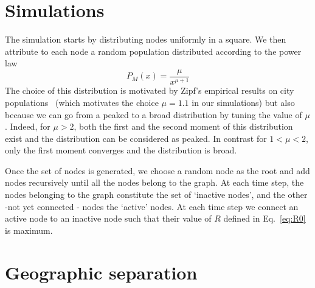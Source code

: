 \begin{materials}

\section{Simulations} 

The simulation starts by distributing nodes uniformly in a square. We then attribute to each node a random population distributed according to the power law
\begin{equation}
P_M(x) = \frac{\mu}{x^{\mu+1}}
\end{equation}
The choice of this distribution is motivated by Zipf's empirical results on city populations~\cite{Zipf:1949} (which motivates the choice $\mu=1.1$ in our simulations) but also because we can go from a peaked to a broad distribution by tuning the value of $\mu$. Indeed, for $\mu>2$, both the first and the second moment of this distribution exist and the distribution can be considered as peaked. In contrast for $1<\mu<2$, only the first moment converges and the distribution is broad.

Once the set of nodes is generated, we choose a random node as the root and add nodes recursively until all the nodes belong to the graph. At each time step, the nodes belonging to the graph constitute the set of `inactive nodes', and the other -not yet connected - nodes the `active' nodes. At each time step we connect an active node to an inactive node such that their value of $R$ defined in Eq.~\ref{eq:R0} is maximum.

\section{Geographic separation} 


\end{materials}
